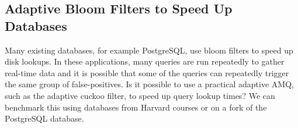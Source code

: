 \documentclass[../paper.tex]{subfiles}
\begin{document}

\subsection{Adaptive Bloom Filters to Speed Up Databases}
Many existing databases, for example PostgreSQL, use bloom filters to speed up disk lookups. In these
applications, many queries are run repeatedly to gather real-time data and it is possible that
some of the queries can repeatedly trigger the same group of false-positives. Is it possible to use
a practical adaptive AMQ, such as the adaptive cuckoo filter, to speed up query lookup times? We can
benchmark this using databases from Harvard courses or on a fork of the PostgreSQL database.
\end{document}

